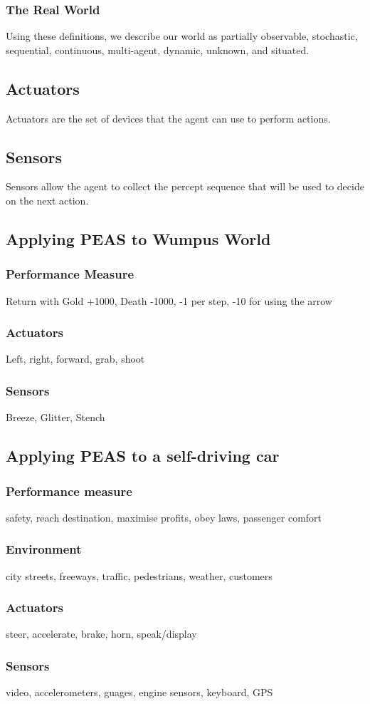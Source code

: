 \subsubsection{The Real World}
Using these definitions, we describe our world as partially observable,
stochastic, sequential, continuous, multi-agent, dynamic, unknown, and situated.

\subsection{Actuators}
Actuators are the set of devices that the agent can use to perform actions.

\subsection{Sensors}
Sensors allow the agent to collect the percept sequence that will be used to
decide on the next action.

\subsection[PEAS: Wumpus World]{Applying PEAS to Wumpus World}
\subsubsection{Performance Measure}
Return with Gold +1000, Death -1000, -1 per step, -10 for using the arrow
\subsubsection{Actuators}
Left, right, forward, grab, shoot
\subsubsection{Sensors}
Breeze, Glitter, Stench

\subsection[PEAS: Self-driving car]{Applying PEAS to a self-driving car}
\subsubsection{Performance measure}
safety, reach destination, maximise profits, obey laws, passenger comfort
\subsubsection{Environment}
city streets, freeways, traffic, pedestrians, weather, customers
\subsubsection{Actuators}
steer, accelerate, brake, horn, speak/display
\subsubsection{Sensors}
video, accelerometers, guages, engine sensors, keyboard, GPS
